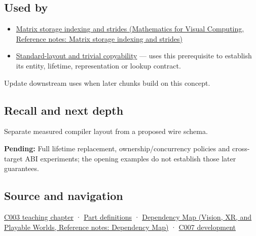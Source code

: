 \subsection{Used by}\label{appendix-c4ac6bb0fff8-used-by}

\begin{itemize}
\item
  \href{../02-Mathematics-for-Visual-Computing/main.pdf\#nameddest=appendix-ffdc1d4e5350}{Matrix storage indexing and strides (Mathematics for Visual Computing, Reference notes: Matrix storage indexing and strides)}
\item
  \hyperref[appendix-958870a64c53]{Standard-layout and trivial copyability} --- uses this prerequisite to establish its entity, lifetime, representation or lookup contract.
\end{itemize}

Update downstream uses when later chunks build on this concept.

\subsection{Recall and next depth}\label{appendix-c4ac6bb0fff8-recall-and-next-depth}

Separate measured compiler layout from a proposed wire schema.

\textbf{Pending:} Full lifetime replacement, ownership/concurrency policies and cross-target ABI experiments; the opening examples do not establish those later guarantees.

\subsection{Source and navigation}\label{appendix-c4ac6bb0fff8-source-and-navigation}

\hyperref[01-foundations-i-ch002-where-the-bytes-live]{C003 teaching chapter} · \hyperref[appendix-fd090d982a15-m003---parts-41-60]{Part definitions} · \href{../07-Vision-XR-and-Playable-Worlds/main.pdf\#nameddest=appendix-4ad47bdd269a}{Dependency Map (Vision, XR, and Playable Worlds, Reference notes: Dependency Map)} · \hyperref[01-foundations-i-ch003-bringing-the-object-model-back-to-bytes]{C007 development}

